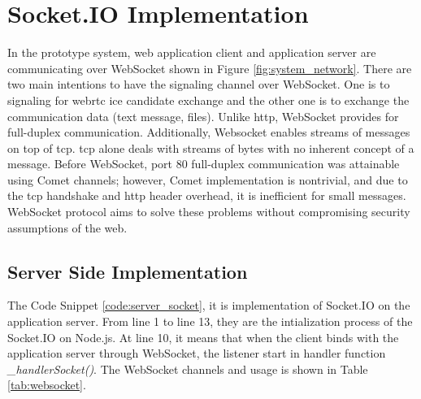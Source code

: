 \section{Socket.IO Implementation}

\noindent In the prototype system, web application client and application server are communicating over WebSocket shown in Figure \ref{fig:system_network}. There are two main intentions to have the signaling channel over WebSocket. One is to signaling for \gls{webrtc} \gls{ice} candidate exchange and the other one is to exchange the communication data (text message, files). Unlike \gls{http}, WebSocket provides for full-duplex communication. Additionally, Websocket enables streams of messages on top of \gls{tcp}. \gls{tcp} alone deals with streams of bytes with no inherent concept of a message. Before WebSocket, port 80 full-duplex communication was attainable using Comet channels; however, Comet implementation is nontrivial, and due to the \gls{tcp} handshake and \gls{http} header overhead, it is inefficient for small messages. WebSocket protocol aims to solve these problems without compromising security assumptions of the web.\cite{wiki:websocket}

\subsection{Server Side Implementation}

\par The Code Snippet \ref{code:server_socket}, it is implementation of Socket.IO on the application server. From line 1 to line 13, they are the intialization process of the Socket.IO on Node.js. At line 10, it means that when the client binds with the application server through WebSocket, the listener start in handler function \textit{\_handlerSocket()}. The WebSocket channels and usage is shown in Table \ref{tab:websocket}.

